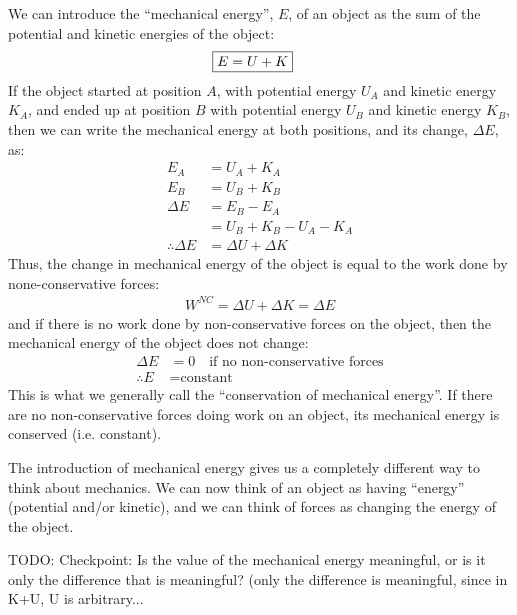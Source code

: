 We can introduce the ``mechanical energy'', $E$, of an object as the sum of the potential and kinetic energies of the object:
\begin{align}
\Aboxed{E = U+K}
\end{align}
If the object started at position $A$, with potential energy $U_A$ and kinetic energy $K_A$, and ended up at position $B$ with potential energy $U_B$ and kinetic energy $K_B$, then we can write the mechanical energy at both positions, and its change, $\Delta E$, as:
\begin{align*}
E_A &= U_A + K_A\\
E_B &= U_B + K_B\\
\Delta E &= E_B - E_A \\
&= U_B + K_B - U_A - K_A\\
\therefore \Delta E &= \Delta U + \Delta K
\end{align*}
Thus, the change in mechanical energy of the object is equal to the work done by none-conservative forces:
\begin{align*}
W^{NC} = \Delta U + \Delta K = \Delta E
\end{align*}
and if there is no work done by non-conservative forces on the object, then the mechanical energy of the object does not change:
\begin{align*}
\Delta E &= 0\quad\text{if no non-conservative forces}\\
\therefore E &= \text{constant}
\end{align*}
This is what we generally call the ``conservation of mechanical energy''. If there are no non-conservative forces doing work on an object, its mechanical energy is conserved (i.e. constant). 

The introduction of mechanical energy gives us a completely different way to think about mechanics. We can now think of an object as having ``energy'' (potential and/or kinetic), and we can think of forces as changing the energy of the object.

TODO: Checkpoint: Is the value of the mechanical energy meaningful, or is it only the difference that is meaningful? (only the difference is meaningful, since in K+U, U is arbitrary...

